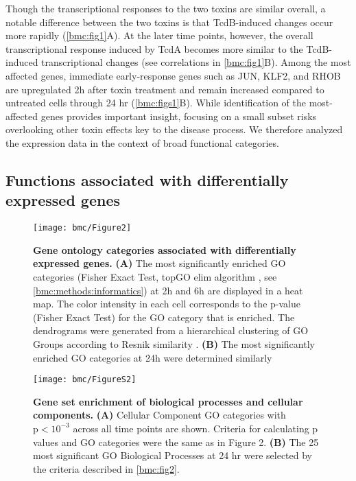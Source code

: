 Though the transcriptional responses to the two toxins 
are similar overall, a notable difference between the 
two toxins is that TcdB-induced changes occur more 
rapidly (\autoref{bmc:fig1}A). At the later time points, 
however, the overall transcriptional response induced by 
TcdA becomes more similar to the TcdB-induced transcriptional 
changes (see correlations in \autoref{bmc:fig1}B). Among 
the most affected genes, immediate early-response genes 
such as JUN, KLF2, and RHOB are upregulated 2h after toxin 
treatment and remain increased compared to untreated cells 
through 24 hr (\autoref{bmc:figs1}B). While identification 
of the most-affected genes provides important insight, 
focusing on a small subset risks overlooking other toxin 
effects key to the disease process. We therefore analyzed 
the expression data in the context of broad functional categories.

\subsection{Functions associated with differentially expressed genes}

\begin{figure}[h!]
  \centering
  \texttt{[image: bmc/Figure2]}
  \caption[Gene ontology categories associated with differentially expressed genes]{
  \textbf{Gene ontology categories associated with differentially expressed genes.}
  \textbf{(A)} The most significantly enriched GO categories 
  (Fisher Exact Test, topGO elim algorithm \cite{Alexa:2006hg}, 
  see \ref{bmc:methods:informatics}) at 2h and 6h are displayed 
  in a heat map. The color intensity in each cell corresponds to 
  the p-value (Fisher Exact Test) for the GO category that is 
  enriched. The dendrograms were generated from a hierarchical 
  clustering of GO Groups according to Resnik similarity \cite{Resnik:1999jl}.
  \textbf{(B)} The most significantly enriched GO 
  categories at 24h were determined similarly
}
  \label{bmc:fig2}
\end{figure}

\begin{sidewaysfigure}
  \centering
  \texttt{[image: bmc/FigureS2]}
  \caption[Gene set enrichment of biological processes and cellular components]{
  \textbf{Gene set enrichment of biological processes 
  and cellular components.}
  \textbf{(A)} Cellular Component GO categories 
  with $\text{p}<10^{-3}$ across all time points 
  are shown. Criteria for calculating p
  values and GO categories were the same 
  as in Figure 2.
  \textbf{(B)} The 25 most significant GO 
  Biological Processes at 24 hr were selected 
  by the criteria described in \autoref{bmc:fig2}.}
  \label{bmc:figs2}
\end{sidewaysfigure}

